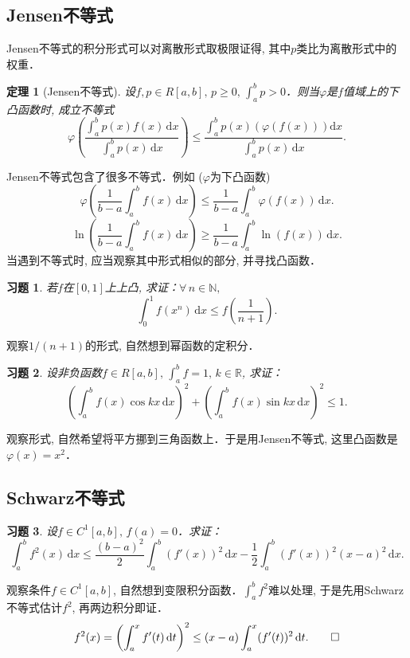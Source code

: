 \documentclass[11pt,a4paper]{ctexart}
\makeatletter
\theoremstyle{thmseries} %
\newtheorem{thm}{定理}[section]
\theoremstyle{exerseries}
\newtheorem{exer}{习题}[section]
\renewenvironment{proof}[1][\proofname]{\par
  \pushQED{\qed}%
  \normalfont \topsep6\p@\@plus6\p@\relax
  \trivlist
  \item[\hskip\labelsep
        \itshape
    #1\@addpunct{}]\ignorespaces
}{%
  \popQED\endtrivlist\@endpefalse
}
\newenvironment{pf}{\begin{proof}[\bfseries\upshape 证\quad]}{\end{proof}}
\newcommand{\bra}[1]{\mathopen{}\left(#1\right)}
\renewcommand{\phi}{\varphi}
\newcommand{\R}{\mathbb{R}}
\newcommand{\N}{\mathbb{N}}
\renewcommand{\d}{\mathrm{d}}
\makeatother
\begin{document}
\subsection{Jensen不等式}
Jensen不等式的积分形式可以对离散形式取极限证得, 其中$p$类比为离散形式中的权重．
\begin{thm}[Jensen不等式]
	设$f,p\in R[a,b],\,p\geq0,\,\int_{a}^{b}p>0$．则当$\phi$是$f$值域上的下凸函数时, 成立不等式
	\[\phi\bra{\frac{\int_{a}^{b}p(x)f(x)\,\d x}{\int_{a}^{b}p(x)\,\d x}}\leq\frac{\int_{a}^{b}p(x)\bra{\phi(f(x))}\d x}{\int_{a}^{b}p(x)\,\d x}.\]
\end{thm}

Jensen不等式包含了很多不等式．例如 ($\phi$为下凸函数)
\[\phi\bra{\frac{1}{b-a}\int_{a}^{b}f(x)\,\d x}\leq\frac{1}{b-a}\int_{a}^{b}\phi(f(x))\,\d x.\]
\[\ln\bra{\frac{1}{b-a}\int_{a}^{b}f(x)\,\d x}\geq\frac{1}{b-a}\int_{a}^{b}\ln(f(x))\,\d x.\]
当遇到不等式时, 应当观察其中形式相似的部分, 并寻找凸函数．

\begin{exer}
	若$f$在$[0,1]$上上凸, 求证：$\forall\,n\in\N,$
	\[\int_{0}^{1}f(x^n)\,\d x\leq f\bra{\frac{1}{n+1}}.\]
\end{exer}
\begin{pf}
	观察$1/(n+1)$的形式, 自然想到幂函数的定积分．
\end{pf}

\begin{exer}
	设非负函数$f\in R[a,b],\,\int_{a}^{b}f=1,\,k\in\R$, 求证：
	\[\bra{\int_{a}^{b}f(x)\cos kx\,\d x}^2+\bra{\int_{a}^{b}f(x)\sin kx\,\d x}^2\leq1.\]
\end{exer}
\begin{pf}
	观察形式, 自然希望将平方挪到三角函数上．于是用Jensen不等式, 这里凸函数是$\phi(x)=x^2$．
\end{pf}

\subsection{Schwarz不等式}
\begin{exer}
	设$f\in C^1[a,b],\,f(a)=0$．求证：
	\[\int_{a}^{b}f^2(x)\,\d x\leq\frac{(b-a)^2}{2}\int_{a}^{b}(f'(x))^2\,\d x-\frac{1}{2}\int_{a}^{b}(f'(x))^2(x-a)^2\,\d x.\]
\end{exer}
\begin{pf}
	观察条件$f\in C^1[a,b]$, 自然想到变限积分函数．$\int_{a}^{b} f^2$难以处理, 于是先用Schwarz不等式估计$f^2$, 再两边积分即证．
	\[f^2(x)=\bra{\int_{a}^{x}f'(t)\,\d t}^2\leq(x-a)\int_{a}^{x}(f'(t))^2\,\d t.\qedhere\]
\end{pf}
\end{document}
